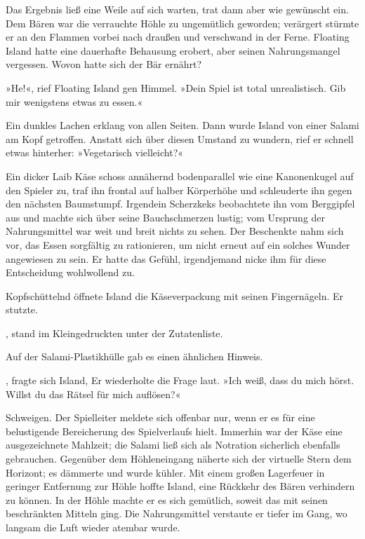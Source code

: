 Das Ergebnis ließ eine Weile auf sich warten, trat dann aber wie gewünscht ein. Dem Bären war die verrauchte Höhle zu ungemütlich geworden; verärgert stürmte er an den Flammen vorbei nach draußen und verschwand in der Ferne. Floating Island hatte eine dauerhafte Behausung erobert, aber seinen Nahrungsmangel vergessen. Wovon hatte sich der Bär ernährt?

»He!«, rief Floating Island gen Himmel. »Dein Spiel ist total unrealistisch. Gib mir wenigstens etwas zu essen.«

Ein dunkles Lachen erklang von allen Seiten. Dann wurde Island von einer Salami am Kopf getroffen. Anstatt sich über diesen Umstand zu wundern, rief er schnell etwas hinterher: »Vegetarisch vielleicht?«

Ein dicker Laib Käse schoss annähernd bodenparallel wie eine Kanonenkugel auf den Spieler zu, traf ihn frontal auf halber Körperhöhe und schleuderte ihn gegen den nächsten Baumstumpf. Irgendein Scherzkeks beobachtete ihn vom Berggipfel aus und machte sich über seine Bauchschmerzen lustig; vom Ursprung der Nahrungsmittel war weit und breit nichts zu sehen. Der Beschenkte nahm sich vor, das Essen sorgfältig zu rationieren, um nicht erneut auf ein solches Wunder angewiesen zu sein. Er hatte das Gefühl, irgendjemand nicke ihm für diese Entscheidung wohlwollend zu.

Kopfschüttelnd öffnete Island die Käseverpackung mit seinen Fingernägeln. Er stutzte.

, stand im Kleingedruckten unter der Zutatenliste. 

Auf der Salami-Plastikhülle gab es einen ähnlichen Hinweis. 

, fragte sich Island,  Er wiederholte die Frage laut. »Ich weiß, dass du mich hörst. Willst du das Rätsel für mich auflösen?«

Schweigen. Der Spielleiter meldete sich offenbar nur, wenn er es für eine belustigende Bereicherung des Spielverlaufs hielt. Immerhin war der Käse eine ausgezeichnete Mahlzeit; die Salami ließ sich als Notration sicherlich ebenfalls gebrauchen. Gegenüber dem Höhleneingang näherte sich der virtuelle Stern dem Horizont; es dämmerte und wurde kühler. Mit einem großen Lagerfeuer in geringer Entfernung zur Höhle hoffte Island, eine Rückkehr des Bären verhindern zu können. In der Höhle machte er es sich gemütlich, soweit das mit seinen beschränkten Mitteln ging. Die Nahrungsmittel verstaute er tiefer im Gang, wo langsam die Luft wieder atembar wurde.

